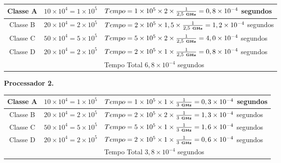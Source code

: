 \documentclass{article}
\begin{document}
\begin{tabular}{|c|l|l|}
\hline Classe A & $10 \times 10^{4} = 1 \times 10^{5}$ &

$Tempo = 1 \times 10^{5} \times 2 \times \frac{1}{2,5\ \textbf{\tiny GHz}} = 
0,8 \times 10^{-4}$ segundos \\

\hline Classe B & $20 \times 10^{4} = 2 \times 10^{5}$ &

$Tempo = 2 \times 10^{5} \times 1,5 \times \frac{1}{2,5\ \textbf{\tiny GHz}} = 
1,2 \times 10^{-4}$ segundos \\

\hline Classe C & $50 \times 10^{4} = 5 \times 10^{5}$ &

$Tempo = 5 \times 10^{5} \times 2 \times \frac{1}{2,5\ \textbf{\tiny GHz}} = 
4,0 \times 10^{-4}$ segundos \\

\hline Classe D & $20 \times 10^{4} = 2 \times 10^{5}$ &

$Tempo = 2 \times 10^{5} \times 1 \times \frac{1}{2,5\ \textbf{\tiny GHz}} = 
0,8 \times 10^{-4}$ segundos \\

\hline & & Tempo Total $6,8 \times 10^{-4}$ segundos \\

\hline
\end{tabular}

\textbf{Processador 2.}

\begin{tabular}{|c|l|l|}
\hline Classe A & $10 \times 10^{4} = 1 \times 10^{5}$ &

$Tempo = 1 \times 10^{5} \times 1 \times \frac{1}{3\ \textbf{\tiny GHz}} = 
0,3 \times 10^{-4}$ segundos \\

\hline Classe B & $20 \times 10^{4} = 2 \times 10^{5}$ &

$Tempo = 2 \times 10^{5} \times 2 \times \frac{1}{3\ \textbf{\tiny GHz}} = 
1,3 \times 10^{-4}$ segundos \\

\hline Classe C & $50 \times 10^{4} = 5 \times 10^{5}$ &

$Tempo = 5 \times 10^{5} \times 1 \times \frac{1}{3\ \textbf{\tiny GHz}} = 
1,6 \times 10^{-4}$ segundos \\

\hline Classe D & $20 \times 10^{4} = 2 \times 10^{5}$ &

$Tempo = 2 \times 10^{5} \times 1 \times \frac{1}{3\ \textbf{\tiny GHz}} = 
0,6 \times 10^{-4}$ segundos \\

\hline & & Tempo Total $3,8 \times 10^{-4}$ segundos \\

\hline
\end{tabular}
\end{document}
